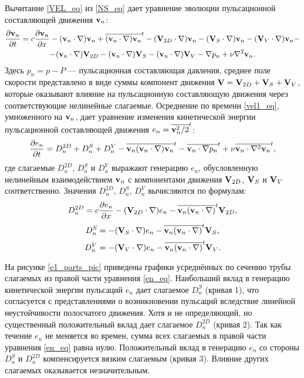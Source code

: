 Вычитание \eqref{VEL_eq} из \eqref{NS_eq} дает уравнение эволюции пульсационной составляющей движения $\mathbf{v}_n$: 
\begin{multline} \label{vel1_eq}
\frac{\partial \mathbf{v}_n}{\partial t} = c \frac{\partial \mathbf{v}_n}{\partial x} - (\mathbf{v}_n \cdot \nabla) \mathbf{v}_n + \overline{(\mathbf{v}_n \cdot \nabla) \mathbf{v}_n}^t - (\mathbf{V}_{2D} \cdot \nabla) \mathbf{v}_n - (\mathbf{V}_S \cdot \nabla) \mathbf{v}_n - (\mathbf{V}_V \cdot \nabla) \mathbf{v}_n - \\ - (\mathbf{v}_n \cdot \nabla) \mathbf{V}_{2D} - (\mathbf{v}_n \cdot \nabla) \mathbf{V}_S - (\mathbf{v}_n \cdot \nabla) \mathbf{V}_V - \nabla p_n + \nu \nabla^2 \mathbf{v}_n. 
\end{multline}
Здесь $p_n = p - P$ --- пульсационная составляющая давления, среднее поле скорости представлено в виде суммы компонент движения $\mathbf{V} = \mathbf{V}_{2D} + \mathbf{V}_S + \mathbf{V}_V$, которые оказывают влияние на пульсационную составляющую движения через соответствующие нелинейные слагаемые. Осреднение по времени \eqref{vel1_eq}, умноженного на $\mathbf{v}_n$, дает уравнение изменения кинетической энергии пульсационной составляющей движения $e_n = \overline{\mathbf{v}_n^2/2}^t$: 
\begin{equation}\label{en_eq}
\frac{\partial e_n}{\partial t} = D_n^{2D} + D_n^{S} + D_n^{V} - \overline{\mathbf{v}_n (\mathbf{v}_n \cdot \nabla) \mathbf{v}_n}^t - \overline{\mathbf{v}_n \cdot \nabla p_n}^t + \nu \overline{\mathbf{v}_n \cdot \nabla^2 \mathbf{v}_n}^t,
\end{equation}
где слагаемые $D_n^{2D}$, $D_n^{S}$ и $D_n^{V}$ выражают генерацию $e_n$, обусловленную нелинейным взаимодействием $\mathbf{v}_n$ с компонентами движения $\mathbf{V}_{2D}$, $\mathbf{V}_S$ и $\mathbf{V}_V$ соответственно. Значения $D_n^{2D}$, $D_n^{S}$, $D_n^{V}$ вычисляются по формулам:
$$
D_n^{2D} = c \frac{\partial e_n}{\partial x}  - (\mathbf{V}_{2D} \cdot \nabla) e_n - \overline{\mathbf{v}_n (\mathbf{v}_n \cdot \nabla) }^t \mathbf{V}_{2D},
$$
$$
D_n^{S}  = - (\mathbf{V}_S \cdot \nabla) e_n - \overline{\mathbf{v}_n (\mathbf{v}_n \cdot \nabla)}^t \mathbf{V}_S,
$$
$$
D_n^{V} =  - (\mathbf{V}_V \cdot \nabla) e_n - \overline{\mathbf{v}_n (\mathbf{v}_n \cdot \nabla)}^t \mathbf{V}_V.
$$

На рисунке \ref{e1_parts_pic} приведены графики усреднённых по сечению трубы слагаемых из правой части уравнения \eqref{en_eq}. Наибольший вклад в генерацию кинетической энергии пульсаций $e_n$ дает слагаемое $D_n^S$ (кривая 1), что согласуется с представлениями о возникновении пульсаций вследствие линейной неустойчивости полосчатого движения. Хотя и не определяющий, но существенный положительный вклад дает слагаемое $D_n^{2D}$ (кривая 2). Так как течение $e_n$ не меняется во времен, сумма всех слагаемых в правой части уравнения \eqref{en_eq} равна нулю. Положительный вклад в генерацию $e_n$ со стороны $D_n^S$ и $D_n^{2D}$ компенсируется вязким слагаемым (кривая 3). Влияние других слагаемых оказывается незначительным. 


